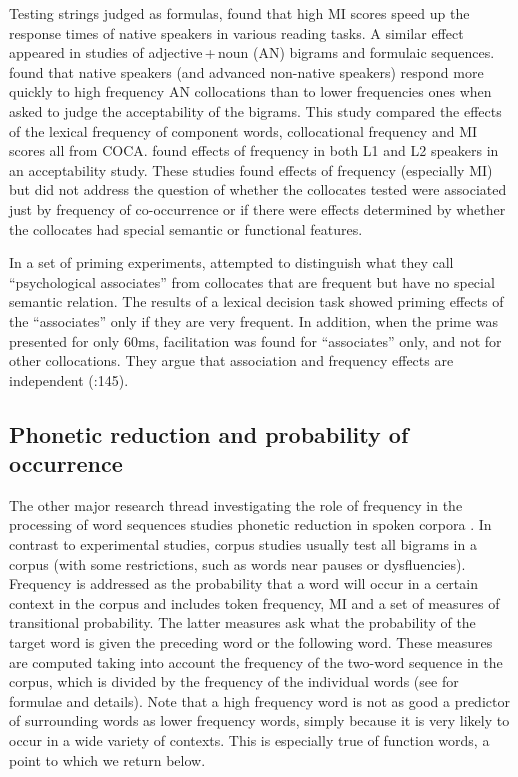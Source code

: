 \documentclass[output=paper]{langscibook}
\begin{document}
Testing strings judged as formulas, \citet{EllisMaynard2008} found that high MI scores speed up the response times of native speakers in various reading tasks. A similar effect appeared in studies of adjective\,+\,noun (AN) bigrams and formulaic sequences. \citet{WolterYamashita2017} found that native speakers (and advanced non-native speakers) respond more quickly to high frequency AN collocations than to lower frequencies ones when asked to judge the acceptability of the bigrams. This study compared the effects of the lexical frequency of component words, collocational frequency and MI scores all from COCA. \citet{ÖksüzRebuschat2020} found effects of frequency in both L1 and L2 speakers in an acceptability study. These studies found effects of frequency (especially MI) but did not address the question of whether the collocates tested were associated just by frequency of co-occurrence or if there were effects determined by whether the collocates had special semantic or functional features.

In a set of priming experiments, \citet{DurrantDoherty2010} attempted to distinguish what they call ``psychological associates'' from collocates that are frequent but have no special semantic relation. The results of a lexical decision task showed priming effects of the ``associates'' only if they are very frequent. In addition, when the prime was presented for only 60ms, facilitation was found for ``associates'' only, and not for other collocations. They argue that association and frequency effects are independent (\citealt{DurrantDoherty2010}:145). 

\subsection{ Phonetic reduction and probability of occurrence}\label{sec:bybee:1.3}

The other major research thread investigating the role of frequency in the processing of word sequences studies phonetic reduction in spoken corpora \citep{GregoryEtAl1999,JurafskyEtAl2001,BellJurafsky2009,Seyfarth2014,SóskuthyHay2017}. In contrast to experimental studies, corpus studies usually test all bigrams in a corpus (with some restrictions, such as words near pauses or dysfluencies). Frequency is addressed as the probability that a word will occur in a certain context in the corpus and includes token frequency, MI and a set of measures of transitional probability. The latter measures ask what the probability of the target word is given the preceding word or the following word. These measures are computed taking into account the frequency of the two-word sequence in the corpus, which is divided by the frequency of the individual words (see \citealt{GregoryEtAl1999,JurafskyEtAl2001} for formulae and details). Note that a high frequency word is not as good a predictor of surrounding words as lower frequency words, simply because it is very likely to occur in a wide variety of contexts. This is especially true of function words, a point to which we return below. 
\end{document}
